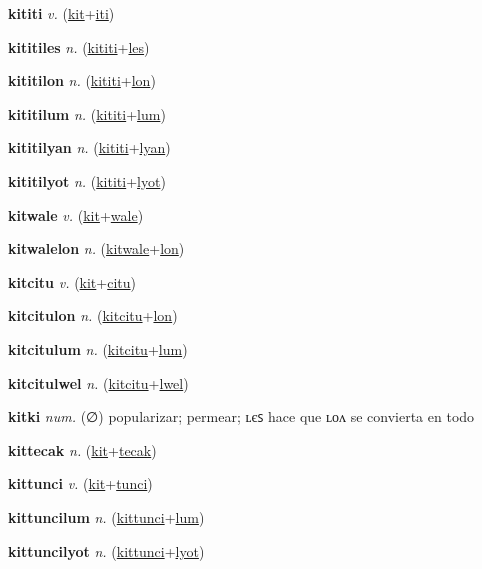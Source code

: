 \textbf{\hypertarget{kititi}{kititi}} \textit{v.} (\hyperlink{kit}{kit}+\allowbreak \hyperlink{iti}{iti})


\textbf{\hypertarget{kititiles}{kititiles}} \textit{n.} (\hyperlink{kititi}{kititi}+\allowbreak \hyperlink{les}{les})


\textbf{\hypertarget{kititilon}{kititilon}} \textit{n.} (\hyperlink{kititi}{kititi}+\allowbreak \hyperlink{lon}{lon})


\textbf{\hypertarget{kititilum}{kititilum}} \textit{n.} (\hyperlink{kititi}{kititi}+\allowbreak \hyperlink{lum}{lum})


\textbf{\hypertarget{kititilyan}{kititilyan}} \textit{n.} (\hyperlink{kititi}{kititi}+\allowbreak \hyperlink{lyan}{lyan})


\textbf{\hypertarget{kititilyot}{kititilyot}} \textit{n.} (\hyperlink{kititi}{kititi}+\allowbreak \hyperlink{lyot}{lyot})


\textbf{\hypertarget{kitwale}{kitwale}} \textit{v.} (\hyperlink{kit}{kit}+\allowbreak \hyperlink{wale}{wale})


\textbf{\hypertarget{kitwalelon}{kitwalelon}} \textit{n.} (\hyperlink{kitwale}{kitwale}+\allowbreak \hyperlink{lon}{lon})


\textbf{\hypertarget{kitcitu}{kitcitu}} \textit{v.} (\hyperlink{kit}{kit}+\allowbreak \hyperlink{citu}{citu})


\textbf{\hypertarget{kitcitulon}{kitcitulon}} \textit{n.} (\hyperlink{kitcitu}{kitcitu}+\allowbreak \hyperlink{lon}{lon})


\textbf{\hypertarget{kitcitulum}{kitcitulum}} \textit{n.} (\hyperlink{kitcitu}{kitcitu}+\allowbreak \hyperlink{lum}{lum})


\textbf{\hypertarget{kitcitulwel}{kitcitulwel}} \textit{n.} (\hyperlink{kitcitu}{kitcitu}+\allowbreak \hyperlink{lwel}{lwel})


\textbf{\hypertarget{kitki}{kitki}} \textit{num.} (∅)
popularizar; permear; ʟєꜱ hace que ʟᴏᴧ se convierta en todo

\textbf{\hypertarget{kittecak}{kittecak}} \textit{n.} (\hyperlink{kit}{kit}+\allowbreak \hyperlink{tecak}{tecak})


\textbf{\hypertarget{kittunci}{kittunci}} \textit{v.} (\hyperlink{kit}{kit}+\allowbreak \hyperlink{tunci}{tunci})


\textbf{\hypertarget{kittuncilum}{kittuncilum}} \textit{n.} (\hyperlink{kittunci}{kittunci}+\allowbreak \hyperlink{lum}{lum})


\textbf{\hypertarget{kittuncilyot}{kittuncilyot}} \textit{n.} (\hyperlink{kittunci}{kittunci}+\allowbreak \hyperlink{lyot}{lyot})


